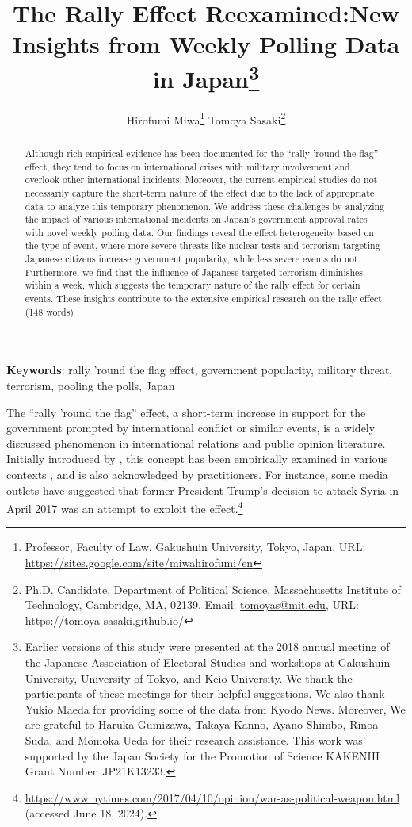 \documentclass[letterpaper,12pt]{scrartcl}
\title{
  \textbf{\textsf{\LARGE The Rally Effect Reexamined:\linebreak New Insights from Weekly Polling Data in Japan}}\if0\blind\thanks{\hspace{3mm}Earlier versions of this study were presented at the 2018 annual meeting of the Japanese Association of Electoral Studies and workshops at Gakushuin University, University of Tokyo, and Keio University. We thank the participants of these meetings for their helpful suggestions. We also thank Yukio Maeda for providing some of the data from Kyodo News. Moreover, We are grateful to Haruka Gumizawa, Takaya Kanno, Ayano Shimbo, Rinoa Suda, and Momoka Ueda for their research assistance. This work was supported by the Japan Society for the Promotion of Science KAKENHI Grant Number~JP21K13233.} \fi
}
\author{
  \if0\blind
  \hspace{1.5in}
  Hirofumi Miwa\thanks{Professor, Faculty of Law, Gakushuin University,
  Tokyo, Japan. URL: \href{https://sites.google.com/site/miwahirofumi/en}{https://sites.google.com/site/miwahirofumi/en}}
  \hspace{.7in}
  Tomoya Sasaki\thanks{Ph.D. Candidate, Department of
  Political Science, Massachusetts Institute of Technology,
  Cambridge, MA, 02139. Email:
  \href{mailto:tomoyas@mit.edu}{tomoyas@mit.edu},
  URL: \href{https://tomoya-sasaki.github.io/}{https://tomoya-sasaki.github.io/}}
  \fi
}
\date{}
\renewcommand{\footnotelayout}{\setstretch{1}}
\begin{document}
\maketitle
\thispagestyle{empty}
\setcounter{page}{0}
\parindent=20pt

\vspace{-5mm}
\begin{abstract}
\noindent
Although rich empirical evidence has been documented for the ``rally 'round the flag'' effect, they tend to focus on international crises with military involvement and overlook other international incidents. Moreover, the current empirical studies do not necessarily capture the short-term nature of the effect due to the lack of appropriate data to analyze this temporary phenomenon. We address these challenges by analyzing the impact of various international incidents on Japan's government approval rates with novel weekly polling data. Our findings reveal the effect heterogeneity based on the type of event, where more severe threats like nuclear tests and terrorism targeting Japanese citizens increase government popularity, while less severe events do not. Furthermore, we find that the influence of Japanese-targeted terrorism diminishes within a week, which suggests the temporary nature of the rally effect for certain events. These insights contribute to the extensive empirical research on the rally effect. (148 words)
\end{abstract}

\bigskip
\bigskip
\noindent \textbf{Keywords}: rally 'round the flag effect, government popularity, military threat, terrorism, pooling the polls, Japan

\newpage
\doublespacing

\noindent
The ``rally 'round the flag'' effect, a short-term increase in support for the government prompted by international conflict or similar events, is a widely discussed phenomenon in international relations and public opinion literature. Initially introduced by \citet{Mueller1970APSR}, this concept has been empirically examined in various contexts \citep[e.g.,][]{Oneal1995PolitBehav,Baker2001JCR,Chapman2004JCR,Lai2005ISQ,seo2023}, and is also acknowledged by practitioners. For instance, some media outlets have suggested that former President Trump's decision to attack Syria in April 2017 was an attempt to exploit the effect.\footnote{\url{https://www.nytimes.com/2017/04/10/opinion/war-as-political-weapon.html} (accessed June 18, 2024).}
\end{document}
